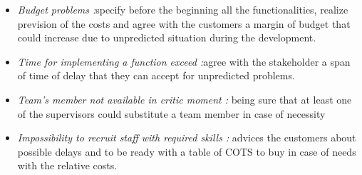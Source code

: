 \newpage
{}
\begin{itemize}
	\item \emph{Budget problems :}specify before the beginning all the functionalities, realize prevision of the costs and agree with the customers a margin of budget that could increase due to unpredicted situation during the development.
	
	\item \emph{Time for implementing a function exceed :}agree with the stakeholder a span of time of delay that they can accept for unpredicted problems.
	
	\item \emph{Team’s member not available in critic moment :} being sure that at least one of the supervisors could substitute a team member in case of necessity
	
	\item \emph{Impossibility to recruit staff with required skills :} advices the customers about possible delays and to be ready with a table of COTS to buy in case of needs with the relative costs.
	
\end{itemize}